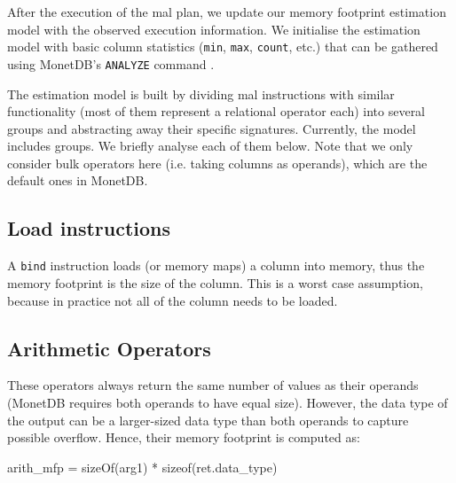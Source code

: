 \documentclass[conference]{IEEEtran}
\def\Skip{\par\medskip\nobreak\noindent}
\begin{document}
After the execution of the {\sc mal} plan, we update our memory footprint estimation model with the observed execution information.
We initialise the estimation model with basic column statistics (\texttt{\small min}, \texttt{\small max}, \texttt{\small count}, etc.) that can be gathered using MonetDB’s \texttt{\small ANALYZE} command .

The estimation model is built by dividing {\sc mal} instructions with similar functionality (most of them represent a relational operator each) into several groups and abstracting away their specific signatures.
Currently, the model includes  groups.
We briefly analyse each of them below.
Note that we only consider bulk operators here (i.e. taking columns as operands), which are the default ones in MonetDB.

\subsection{Load instructions}
A \texttt{\small bind} instruction loads (or memory maps) a column into memory, thus the memory footprint is the size of the column.
This is a worst case assumption, because in practice not all of the column needs to be loaded.

\subsection{Arithmetic Operators}
These operators always return the same number of values as their operands (MonetDB requires both operands to have equal size).
However, the data type of the output can be a larger-sized data type than both operands to capture possible overflow.
Hence, their memory footprint is computed as:
\begin{verb}
arith_mfp = sizeOf(arg1) * sizeof(ret.data_type)
\end{verb}
\end{document}
